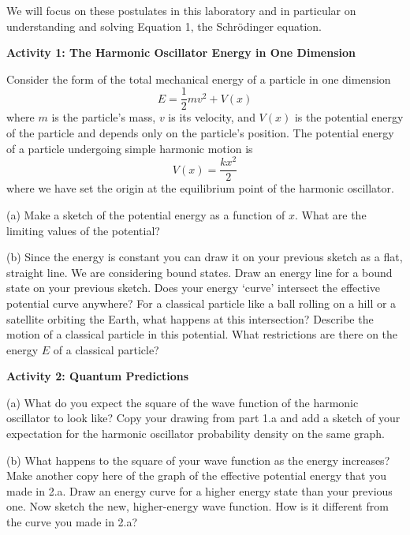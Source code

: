 \noindent We will focus on these postulates in this laboratory and in particular
on understanding and solving Equation 1, the Schr\"odinger equation.

\textbf{Activity 1: The Harmonic Oscillator Energy in One  Dimension}


Consider the form of the total
mechanical energy of a particle in one dimension
\begin{equation}
E =    \frac{1}{2} m v^2 + V(x) 
\end{equation}
where $m$ is the particle's mass, $v$ is its
velocity, and  $V(x)$ is the potential energy of the particle
and depends only on the particle's position.
The potential energy of a particle undergoing simple harmonic motion is
\begin{equation}
V(x) = \frac{kx^2}{2}
\end{equation}
where we have set the origin at the equilibrium point of the harmonic oscillator.

\newpage

(a) Make a sketch of the potential energy as a function of $x$.
What are the limiting values of the potential?
\vskip 3.5cm

(b) Since the energy is constant you can draw it on your previous sketch as a flat, straight
line. We are considering bound states.
Draw an energy line for a bound state on your previous sketch.
Does your energy `curve' intersect the effective potential curve anywhere?
For a classical particle like a ball rolling on a hill or a satellite orbiting the
Earth,
what happens at this intersection?
Describe the motion of a classical particle in this potential.
What restrictions are there on the energy $E$ of a classical particle?
\vskip 3.0cm

\textbf{Activity 2: Quantum Predictions}

(a) What do you expect the square of the wave function of the harmonic oscillator to look like?
Copy your drawing from part 1.a and add
a sketch of your expectation for the harmonic oscillator probability density on the same graph. 
\vskip 5.0cm

(b) What happens to the square of your wave function as the energy increases?
Make another copy here of the graph of the effective potential energy that you made in 2.a.
Draw an energy curve for a higher energy state than your previous one.
Now sketch the new, higher-energy wave function.
How is it different from the curve you made in 2.a?
\vskip 5.0cm

\newpage

